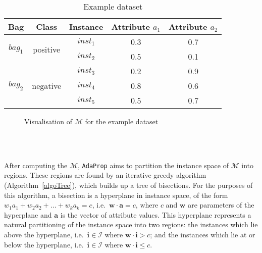 \documentclass[a4paper,12pt]{article} %
\newcommand{\AdaProp}{\texttt{AdaProp}\xspace}
\newcommand{\mcl}[1]{\mathcal{#1}}
\newcommand{\vect}[1]{\boldsymbol{#1}}
\begin{document}
\begin{table}
\begin{center}
\begin{tabular}{ccccc}
    \toprule
    Bag & Class & Instance & Attribute $a_1$ & Attribute $a_2$ \\
    \midrule
    \multirow{2}{*}{$bag_1$} & \multirow{2}{*}{positive} & $inst_1$ & 0.3 & 0.7 \\
    &  & $inst_2$ & 0.5 & 0.1 \\
    \cmidrule(r){1-5}
    \multirow{3}{*}{$bag_2$} & \multirow{3}{*}{negative} & $inst_3$ & 0.2 & 0.9 \\
    & & $inst_4$ & 0.8 & 0.6 \\
    & & $inst_5$ & 0.5 & 0.7 \\
    \bottomrule
    
\end{tabular}
\end{center}
\caption{Example dataset}
\label{tEgData}
\end{table}

\begin{figure}
\begin{center}
\end{center}
\caption{Visualisation of $\mcl{M}$ for the example dataset}
\label{visM}
\end{figure}

\ \\ \ 

After computing the $\mcl{M}$, 
    \AdaProp aims to partition the instance space of $\mcl{M}$ into regions.
These regions are found by an iterative greedy algorithm (Algorithm~\ref{algoTree}), 
    which builds up a tree of bisections.
For the purposes of this algorithm, 
    a bisection is a hyperplane in instance space, 
    of the form $w_1a_1 + w_2a_2 + \ldots + w_ka_k = c $, 
    i.e.\ $\vect{w} \cdot \vect{a} = c$,
    where $c$ and $\vect{w}$ are parameters of the hyperplane and 
    $\vect{a}$ is the vector of attribute values.
This hyperplane represents a natural partitioning of the instance space
    into two regions:
        the instances which lie above the hyperplane, 
            i.e.\ $\vect{i} \in \mcl{I}$ where $\vect{w} \cdot \vect{i} > c$; and
        the instances which lie at or below the hyperplane,
            i.e.\ $\vect{i} \in \mcl{I}$ where $\vect{w} \cdot \vect{i} \leq c$.
    
\end{document}
